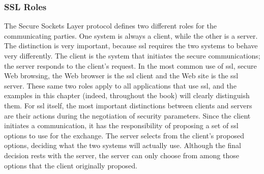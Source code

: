 \subsubsection{SSL Roles}
The Secure Sockets Layer protocol defines two different roles for the
communicating parties. One system is always a client, while the other
is a server. The distinction is very important, because ssl requires the
two systems to behave very differently. The client is the system that
initiates the secure communications; the server responds to the client’s request. In the most common use of ssl, secure Web browsing,
the Web browser is the ssl client and the Web site is the ssl server.
These same two roles apply to all applications that use ssl, and the
examples in this chapter (indeed, throughout the book) will clearly
distinguish them.
For ssl itself, the most important distinctions between clients and
servers are their actions during the negotiation of security parameters. Since the client initiates a communication, it has the
responsibility of proposing a set of ssl options to use for the
exchange. The server selects from the client’s proposed options,
deciding what the two systems will actually use. Although the final
decision rests with the server, the server can only choose from among
those options that the client originally proposed.

